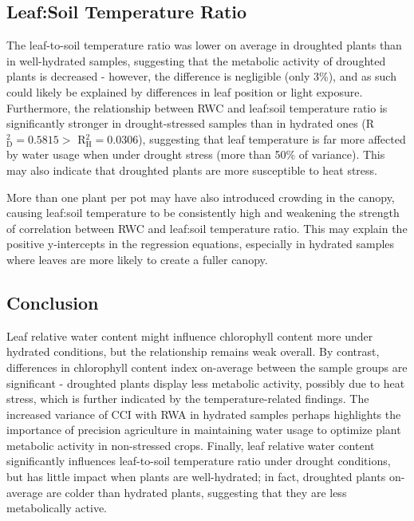\documentclass{report}
\begin{document}
\subsection*{Leaf:Soil Temperature Ratio}

\hspace{24pt}The leaf-to-soil temperature ratio was lower on average in droughted plants than in well-hydrated samples, suggesting that the metabolic activity of droughted plants is decreased - however, the difference is negligible (only 3\%), and as such could likely be explained by differences in leaf position or light exposure. Furthermore, the relationship between RWC and leaf:soil temperature ratio is significantly stronger in drought-stressed samples than in hydrated ones (R${}^{2}_{\text{D}} = 0.5815 >$ R${}^{2}_{\text{H}} = 0.0306$), suggesting that leaf temperature is far more affected by water usage when under drought stress (more than 50\% of variance). This may also indicate that droughted plants are more susceptible to heat stress.

\hspace{24pt}More than one plant per pot may have also introduced crowding in the canopy, causing leaf:soil temperature to be consistently high and weakening the strength of correlation between RWC and leaf:soil temperature ratio. This may explain the positive y-intercepts in the regression equations, especially in hydrated samples where leaves are more likely to create a fuller canopy.


\subsection*{Conclusion}

\hspace{24pt} Leaf relative water content might influence chlorophyll content more under hydrated conditions, but the relationship remains weak overall. By contrast, differences in chlorophyll content index on-average between the sample groups are significant - droughted plants display less metabolic activity, possibly due to heat stress, which is further indicated by the temperature-related findings. The increased variance of CCI with RWA in hydrated samples perhaps highlights the importance of precision agriculture in maintaining water usage to optimize plant metabolic activity in non-stressed crops. Finally, leaf relative water content significantly influences leaf-to-soil temperature ratio under drought conditions, but has little impact when plants are well-hydrated; in fact, droughted plants on-average are colder than hydrated plants, suggesting that they are less metabolically active.

\clearpage

\printbibliography
\end{document}
